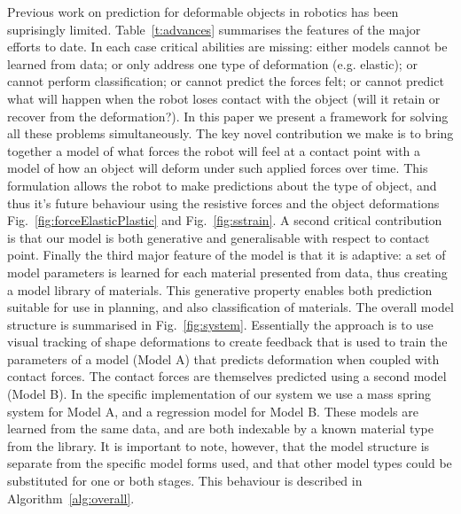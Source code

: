 \documentclass[journal]{IEEEtran}
\newcommand{\fref}[1]{Fig.~\ref{#1}}
\newcommand{\alref}[1]{Algorithm~\ref{#1}}
\begin{document}
Previous work on prediction for deformable objects in robotics has been suprisingly limited. Table~\ref{t:advances} summarises the features of the major efforts to date. In each case critical abilities are missing: either models cannot be learned from data; or only address one type of deformation (e.g. elastic); or cannot perform classification; or cannot predict the forces felt; or cannot predict what will happen when the robot loses contact with the object (will it retain or recover from the deformation?). In this paper we present a framework for solving all these problems simultaneously. The key novel contribution we make is to bring together a model of what forces the robot will feel at a contact point with a model of how an object will deform under such applied forces over time. This formulation allows the robot to make predictions about the type of object, and thus it's future behaviour using the resistive forces and the object deformations \fref{fig:forceElasticPlastic} and \fref{fig:sstrain}. A second critical contribution is that our model is both generative and generalisable with respect to contact point.  Finally the third major feature of the model is that it is adaptive: a set of model parameters is learned for each material presented from data, thus creating a model library of materials. This generative property enables both prediction suitable for use in planning, and also classification of materials. The overall model structure is summarised in \fref{fig:system}. Essentially the approach is to use visual tracking of shape deformations to create feedback that is used to train the parameters of a model (Model A) that predicts deformation when coupled with contact forces. The contact forces are themselves predicted using a second model (Model B). In the specific implementation of our system we use a mass spring system for Model A, and a regression model for Model B. These models are learned from the same data, and are both indexable by a known material type from the library. It is important to note, however, that the model structure is separate from the specific model forms used, and that other model types could be substituted for one or both stages.  This behaviour is described in \alref{alg:overall}.
\end{document}
